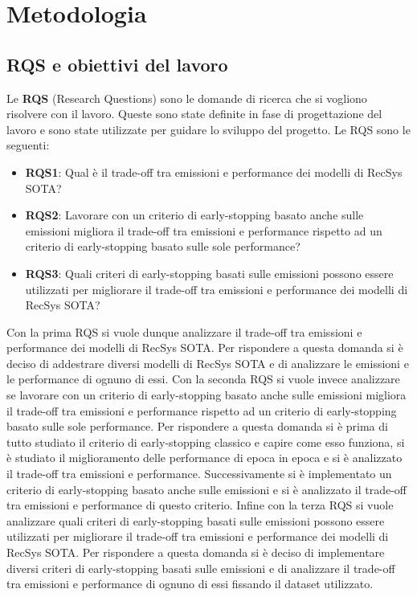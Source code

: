 \section{Metodologia}

\subsection{RQS e obiettivi del lavoro}

Le \textbf{RQS} (Research Questions) sono le domande di ricerca che si vogliono risolvere con il lavoro. Queste sono state definite in fase di progettazione del lavoro e sono state utilizzate per guidare lo sviluppo del progetto. Le RQS sono le seguenti:
\begin{itemize}
    \item \textbf{RQS1}: Qual è il trade-off tra emissioni e performance dei modelli di RecSys SOTA?
    \item \textbf{RQS2}: Lavorare con un criterio di early-stopping basato anche sulle emissioni migliora il trade-off tra emissioni e performance rispetto ad un criterio di early-stopping basato sulle sole performance?
    \item \textbf{RQS3}: Quali criteri di early-stopping basati sulle emissioni possono essere utilizzati per migliorare il trade-off tra emissioni e performance dei modelli di RecSys SOTA?
\end{itemize}

\noindent Con la prima RQS si vuole dunque analizzare il trade-off tra emissioni e performance dei modelli di RecSys SOTA. Per rispondere a questa domanda si è deciso di addestrare diversi modelli di RecSys SOTA e di analizzare le emissioni e le performance di ognuno di essi. Con la seconda RQS si vuole invece analizzare se lavorare con un criterio di early-stopping basato anche sulle emissioni migliora il trade-off tra emissioni e performance rispetto ad un criterio di early-stopping basato sulle sole performance. Per rispondere a questa domanda si è prima di tutto studiato il criterio di early-stopping classico e capire come esso funziona, si è studiato il miglioramento delle performance di epoca in epoca e si è analizzato il trade-off tra emissioni e performance. Successivamente si è implementato un criterio di early-stopping basato anche sulle emissioni e si è analizzato il trade-off tra emissioni e performance di questo criterio. Infine con la terza RQS si vuole analizzare quali criteri di early-stopping basati sulle emissioni possono essere utilizzati per migliorare il trade-off tra emissioni e performance dei modelli di RecSys SOTA. Per rispondere a questa domanda si è deciso di implementare diversi criteri di early-stopping basati sulle emissioni e di analizzare il trade-off tra emissioni e performance di ognuno di essi fissando il dataset utilizzato.

